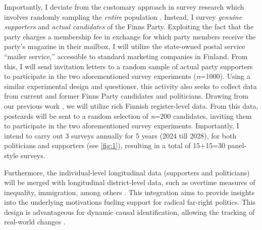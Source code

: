 \documentclass[letterpaper]{article}
\begin{document}
\vspace{2mm}Importantly, I deviate from the customary approach in survey research which involves randomly sampling the \emph{entire} population \parencite{Mudde2007b}. Instead, I survey \emph{genuine supporters} and \emph{actual candidates} of the Finns Party. Exploiting the fact that the party charges a membership fee in exchange for which party members receive the party's magazine in their mailbox, I will utilize the state-owned postal service ``mailer service,'' accessible to standard marketing companies in Finland. From this, I will send invitation letters to a random sample of actual party supporters to participate in the two aforementioned survey experiments (\emph{n}=1000). Using a similar experimental design and questioner, this activity also seeks to collect data from current and former Finns Party candidates and politicians. Drawing from our previous work \parencite{Bahamonde:2023}, we will utilize rich Finnish register-level data. From this data, postcards will be sent to a random selection of \emph{n}=200 candidates, inviting them to participate in the two aforementioned survey experiments. Importantly, I intend to carry out 3 surveys annually for 5 years (2024 till 2028), for both politicians and supporters (see \autoref{fig:1}), resulting in a total of 15+15=30 panel-style surveys.

\vspace{2mm}Furthermore, the individual-level longitudinal data (supporters and politicians) will be merged with longitudinal district-level data, such as overtime measures of inequality, immigration, among others \parencite{Dehdari2022,Kurer2019,Gidron2020}. This integration aims to provide insights into the underlying motivations fueling support for radical far-right politics. This design is advantageous for dynamic causal identification, allowing the tracking of real-world changes \parencite{Im2023}.
\end{document}
